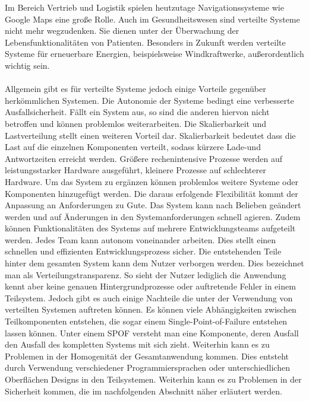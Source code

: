 Im Bereich Vertrieb und Logistik spielen heutzutage Navigationssysteme wie Google Maps eine große Rolle. Auch im Gesundheitswesen sind verteilte Systeme nicht mehr wegzudenken. Sie dienen unter
der Überwachung der Lebensfunktionalitäten von Patienten. Besonders in Zukunft werden verteilte Systeme für erneuerbare Energien, beispielsweise Windkraftwerke, außerordentlich wichtig sein. \cite{o.V.2011}
\\\\
Allgemein gibt es für verteilte Systeme jedoch einige Vorteile gegenüber herkömmlichen Systemen. Die Autonomie der Systeme bedingt eine verbesserte Ausfallsicherheit.
Fällt ein System aus, so sind die anderen hiervon nicht betroffen und können problemlos weiterarbeiten. 
Die Skalierbarkeit und Lastverteilung stellt einen weiteren Vorteil dar. Skalierbarkeit bedeutet dass die Last auf die einzelnen Komponenten verteilt, sodass kürzere Lade-und Antwortzeiten
erreicht werden. Größere rechenintensive Prozesse werden auf leistungsstarker Hardware ausgeführt, kleinere Prozesse auf schlechterer Hardware. Um das System zu ergänzen können problemlos weitere
Systeme oder Komponenten hinzugefügt werden. Die daraus erfolgende Flexibilität kommt der Anpassung an Anforderungen zu Gute. Das System kann nach Belieben geändert werden und auf Änderungen
in den Systemanforderungen schnell agieren. Zudem können Funktionalitäten des Systems auf mehrere Entwicklungsteams aufgeteilt werden. Jedes Team kann autonom voneinander arbeiten. Dies stellt
einen schnellen und effizienten Entwicklungsprozess sicher. Die entstehenden Teile hinter dem gesamten System kann dem Nutzer verborgen werden. Dies bezeichnet man als Verteilungstransparenz. So sieht der Nutzer
lediglich die Anwendung kennt aber keine genauen Hintergrundprozesse oder auftretende Fehler in einem Teilsystem. \cite{Mandl.2009}
\newline
Jedoch gibt es auch einige Nachteile die unter der Verwendung von verteilten Systemen auftreten können. Es können viele Abhängigkeiten zwischen Teilkomponenten entstehen, 
die sogar einem Single-Point-of-Failure entstehen lassen können. Unter einem SPOF versteht man eine Komponente, deren Ausfall den Ausfall des kompletten Systems mit sich zieht. Weiterhin kann
es zu Problemen in der Homogenität der Gesamtanwendung kommen. Dies entsteht durch Verwendung verschiedener Programmiersprachen oder unterschiedlichen Oberflächen Designs in den Teilsystemen. 
Weiterhin kann es zu Problemen in der Sicherheit kommen, die im nachfolgenden Abschnitt näher erläutert werden.

